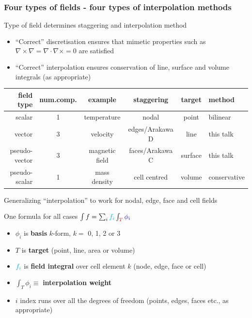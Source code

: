 \documentclass[aspectratio=169]{beamer}
\begin{document}
\begin{frame}[t]
  \frametitle{Four types of fields - four types of interpolation methods}
  \begin{block}{Type of field determines staggering and interpolation method}
  \begin{itemize}
  	\item``Correct'' discretisation ensures that mimetic properties such as $\nabla \times \nabla = \nabla \cdot \nabla \times = 0$ are satisfied
  	\item ``Correct'' interpolation ensures conservation of line, surface and volume integrals (as appropriate)
  \end{itemize}
\end{block}
\begin{tabular} {|r|c|c|c|c|l|}
\hline
{\color{blue} field type}                 &  num.comp. & example         & staggering       & target  & {\color{blue} method}  \\
\hline
{\color{blue} scalar}                     &       1         & temperature     & nodal            &   point  & {\color{blue} bilinear} \\
{\color{magenta} vector}        &       {\color{red} 3}         & {\color{red} velocity}        & {\color{red} edges/Arakawa D} &  {\color{red} line}    & {\color{magenta} this talk} \\
{\color{magenta} pseudo-vector} &       {\color{red} 3}         & {\color{red} magnetic field}  & {\color{red} faces/Arakawa C}  &  {\color{red} surface} & {\color{magenta} this talk} \\
{\color{blue} pseudo-scalar}              &       1         & mass density    & cell centred     &  volume  & {\color{blue} conservative} \\
\hline
\end{tabular}

\end{frame}

\begin{frame}[fragile]{Generalizing ``interpolation'' to work for nodal, edge, face and cell fields}
\begin{block}{One formula for all cases}
$\int f = \sum_i {\color{cyan} f_i} \int_{\color{red} T} {\color{blue} \phi_i}$
\begin{itemize}
\item {\color{blue} $\phi_i$} is \textbf{basis} $k$-form, $k =$ 0, 1, 2 or 3
\item {\color{red} $T$} is \textbf{target} (point, line, area or volume)
\item ${\color{cyan} f_i}$ is \textbf{field integral} over cell element $k$ (node, edge, face or cell)
\item $\int_T \phi_i \equiv$ \textbf{interpolation weight}
\item $i$ index runs over all the degrees of freedom (points, edges, faces etc., as appropriate)
\end{itemize}
\end{block}
\end{frame}
\end{document}
